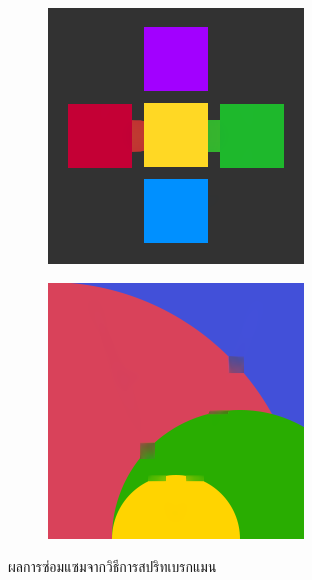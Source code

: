 \begin{figure}[H]
\begin{subfigure}{\ResultSubFigureWidth \linewidth}
	\end{subfigure}
	\vspace{1cm}
	\begin{subfigure}{\ResultSubFigureWidth \linewidth}
		\centering
		\includegraphics[width=\ResultSubFigurePadding \linewidth]{image/result_ex1/splitbergman04.png}			
	\end{subfigure}
	\begin{subfigure}{\ResultSubFigureWidth \linewidth}
		\centering
		\includegraphics[width=\ResultSubFigurePadding \linewidth]{image/result_ex1/splitbergman05.png}			
	\end{subfigure}
	\caption{ผลการซ่อมแซมจากวิธีการสปริทเบรกแมน}
	\label{figure:result-splitbregman}
\end{figure}